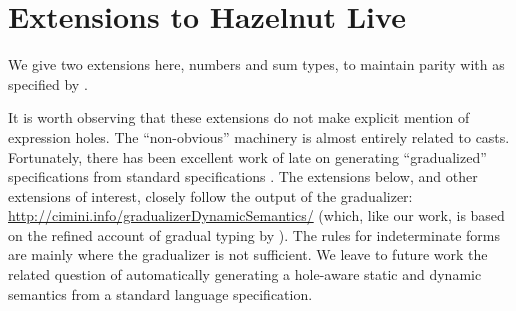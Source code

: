 \clearpage
\newcommand{\extensionsSec}{Extensions to Hazelnut Live}
\section{\protect\extensionsSec} %
\label{sec:extensions}

We give two extensions here, numbers and sum types, to maintain parity with \Hazelnut as specified by \citet{popl-paper}.

It is worth observing that these extensions do not make explicit mention of expression holes. The ``non-obvious'' machinery is almost entirely related to casts. Fortunately, there has been excellent work of late on generating ``gradualized'' specifications from standard specifications \cite{DBLP:conf/popl/CiminiS16,DBLP:conf/popl/CiminiS17}. The extensions below, and other extensions of interest, closely follow the output of the gradualizer: \url{http://cimini.info/gradualizerDynamicSemantics/} (which, like our work, is based on the refined account of gradual typing by \cite{DBLP:conf/snapl/SiekVCB15}). The rules for indeterminate forms are mainly where the gradualizer is not sufficient. We leave to future work the related question of automatically generating a hole-aware static and dynamic semantics from a standard language specification.


%




